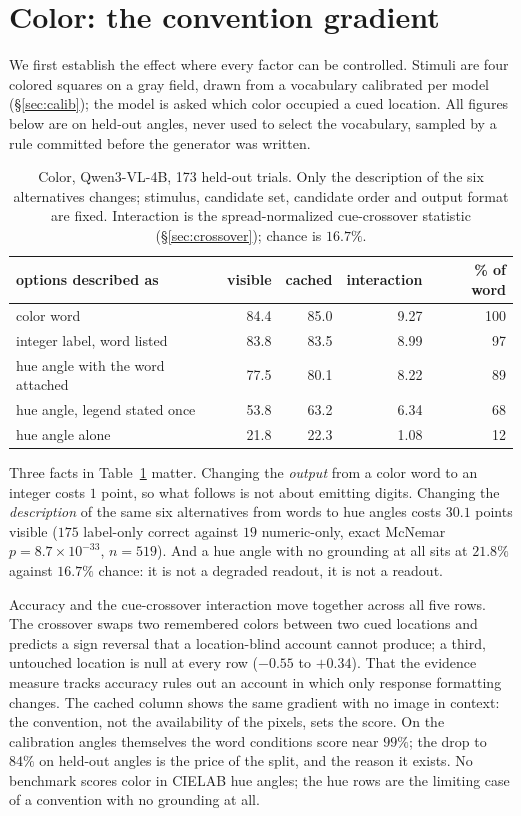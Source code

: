 \documentclass{article}
\begin{document}
\section{Color: the convention gradient}
\label{sec:color}

We first establish the effect where every factor can be controlled. Stimuli are
four colored squares on a gray field, drawn from a vocabulary calibrated per
model (\S\ref{sec:calib}); the model is asked which color occupied a cued
location. All figures below are on held-out angles, never used to select the
vocabulary, sampled by a rule committed before the generator was written.

\begin{table}[t]
\centering
\caption{Color, Qwen3-VL-4B, 173 held-out trials. Only the description of the six
alternatives changes; stimulus, candidate set, candidate order and output format
are fixed. Interaction is the spread-normalized cue-crossover statistic (\S\ref{sec:crossover}); chance is $16.7\%$.}
\label{tab:color}
\begin{tabular}{lrrrr}
\toprule
options described as & visible & cached & interaction & \% of word \\
\midrule
color word                      & 84.4 & 85.0 & 9.27 & 100 \\
integer label, word listed       & 83.8 & 83.5 & 8.99 & 97 \\
hue angle with the word attached & 77.5 & 80.1 & 8.22 & 89 \\
hue angle, legend stated once    & 53.8 & 63.2 & 6.34 & 68 \\
hue angle alone                  & 21.8 & 22.3 & 1.08 & 12 \\
\bottomrule
\end{tabular}
\end{table}

Three facts in Table~\ref{tab:color} matter. Changing the \emph{output} from a
color word to an integer costs $1$ point, so what follows is not about emitting
digits. Changing the \emph{description} of the same six alternatives from words to
hue angles costs $30.1$ points visible ($175$ label-only correct against $19$
numeric-only, exact McNemar $p=8.7\times10^{-33}$, $n=519$). And a hue angle with
no grounding at all sits at $21.8\%$ against $16.7\%$ chance: it is not a degraded
readout, it is not a readout.

Accuracy and the cue-crossover interaction move together across all five rows. The
crossover swaps two remembered colors between two cued locations and predicts a
sign reversal that a location-blind account cannot produce; a third, untouched
location is null at every row ($-0.55$ to $+0.34$). That the evidence measure
tracks accuracy rules out an account in which only response formatting changes.
The cached column shows the same gradient with no image in context: the
convention, not the availability of the pixels, sets the score. On the
calibration angles themselves the word conditions score near $99\%$; the drop to
$84\%$ on held-out angles is the price of the split, and the reason it exists. No
benchmark scores color in CIELAB hue angles; the hue rows are the limiting case of
a convention with no grounding at all.
\end{document}
